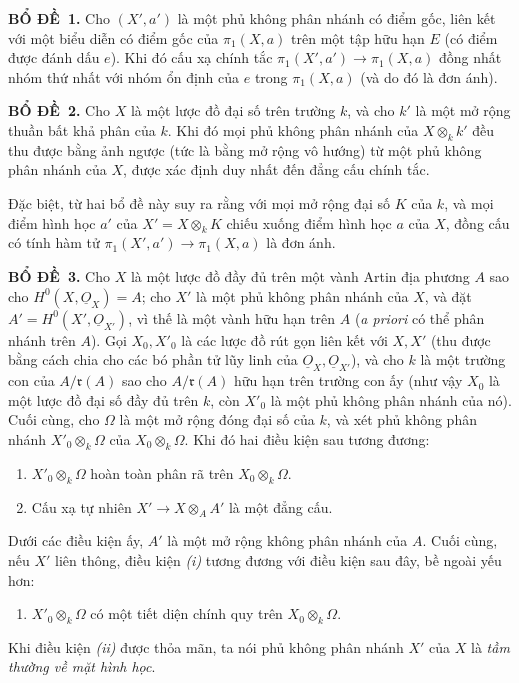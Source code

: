 \documentclass[11pt,twoside,openany]{book}
\numberwithin{equation}{section}
\newcommand{\Osh}{\underline{O}}
\newcommand{\result}[2]{\par\medskip\noindent\textbf{#1\if\relax\detokenize{#2}\relax\else\ #2\fi.}\quad}
\begin{document}
\result{BỔ ĐỀ}{1} Cho $(X',a')$ là một phủ không phân nhánh có điểm gốc, liên
kết với một biểu diễn có điểm gốc của $\pi_1(X,a)$ trên một tập hữu hạn $E$
(có điểm được đánh dấu $e$). Khi đó cấu xạ chính tắc
$\pi_1(X',a')\longrightarrow\pi_1(X,a)$ đồng nhất nhóm thứ nhất với nhóm ổn
định của $e$ trong $\pi_1(X,a)$ (và do đó là đơn ánh).

\result{BỔ ĐỀ}{2} Cho $X$ là một lược đồ đại số trên trường $k$, và cho $k'$
là một mở rộng thuần bất khả phân của $k$. Khi đó mọi phủ không phân nhánh của
$X\otimes_k k'$ đều thu được bằng ảnh ngược (tức là bằng mở rộng vô hướng) từ
một phủ không phân nhánh của $X$, được xác định duy nhất đến đẳng cấu chính
tắc.

Đặc biệt, từ hai bổ đề này suy ra rằng với mọi mở rộng đại số $K$ của $k$, và
mọi điểm hình học $a'$ của $X'=X\otimes_k K$ chiếu xuống điểm hình học $a$ của
$X$, đồng cấu có tính hàm tử
$\pi_1(X',a')\longrightarrow\pi_1(X,a)$ là đơn ánh.

\result{BỔ ĐỀ}{3} Cho $X$ là một lược đồ đầy đủ trên một vành Artin địa phương
$A$ sao cho $H^0(X,\Osh_X)=A$; cho $X'$ là một phủ không phân nhánh của $X$,
và đặt $A'=H^0(X',\Osh_{X'})$, vì thế là một vành hữu hạn trên $A$
(\textit{a priori} có thể phân nhánh trên $A$). Gọi $X_0,X'_0$ là các lược đồ
rút gọn liên kết với $X,X'$ (thu được bằng cách chia cho các bó phần tử lũy
linh của $\Osh_X,\Osh_{X'}$), và cho $k$ là một trường con của
$A/\mathfrak r(A)$ sao cho $A/\mathfrak r(A)$ hữu hạn trên trường con ấy (như vậy
$X_0$ là một lược đồ đại số đầy đủ trên $k$, còn $X'_0$ là một phủ không phân
nhánh của nó). Cuối cùng, cho $\Omega$ là một mở rộng đóng đại số của $k$, và
xét phủ không phân nhánh $X'_0\otimes_k\Omega$ của
$X_0\otimes_k\Omega$. Khi đó hai điều kiện sau tương đương:
\begin{enumerate}
  \item[\textit{i.}] $X'_0\otimes_k\Omega$ hoàn toàn phân rã trên
    $X_0\otimes_k\Omega$.
  \item[\textit{ii.}] Cấu xạ tự nhiên
    $X'\longrightarrow X\otimes_A A'$ là một đẳng cấu.
\end{enumerate}
Dưới các điều kiện ấy, $A'$ là một mở rộng không phân nhánh của $A$. Cuối
cùng, nếu $X'$ liên thông, điều kiện \textit{(i)} tương đương với điều kiện
sau đây, bề ngoài yếu hơn:
\begin{enumerate}
  \item[\textit{i bis.}] $X'_0\otimes_k\Omega$ có một tiết diện chính quy
    trên $X_0\otimes_k\Omega$.
\end{enumerate}
Khi điều kiện \textit{(ii)} được thỏa mãn, ta nói phủ không phân nhánh $X'$
của $X$ là \emph{tầm thường về mặt hình học}.
\end{document}
